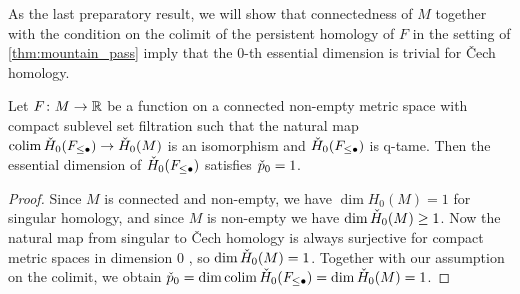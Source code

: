 As the last preparatory result, we will show that connectedness of $M$ together with the condition on the colimit of the persistent homology of $F$ in the setting of \cref{thm:mountain_pass} imply that the $0$-th essential dimension is trivial for \v{C}ech homology.

\begin{lem}
\label{lem:essential_cech_dim}
	Let $F \colon M \to \mathbb{R}$ be a function on a connected non-empty metric space with compact sublevel set filtration such that the natural map $\operatorname*{colim} \check{H}_0(F_{\leq \bullet}) \to \check{H}_0(M)$ is an isomorphism and $\check{H}_0(F_{\leq \bullet})$ is q-tame.
	Then the essential dimension of $\check{H}_0(F_{\leq \bullet})$ satisfies $\check{p}_{0} = 1$.
\end{lem}
\begin{proof}
	Since $M$ is connected and non-empty, we have $\dim H_{0}(M) = 1$ for singular homology, and since $M$ is non-empty we have $\dim \check{H}_0(M) \geq 1$.
	Now the natural map from singular to \v{C}ech homology is always surjective for compact metric spaces in dimension 0 \cite{Eda.2000}, so $\dim \check{H}_0(M) = 1$.
	Together with our assumption on the colimit, we obtain $\check{p}_0 = \dim \operatorname*{colim} \check{H}_0(F_{\leq \bullet}) = \dim \check{H}_0(M) = 1$.
\end{proof}

